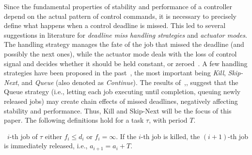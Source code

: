 Since the fundamental properties of stability and performance of a controller depend on the actual pattern of control commands, it is necessary to precisely define what happens when a control deadline is missed.
This led to several suggestions in literature for \emph{deadline miss handling strategies} and \emph{actuator modes}.
The handling strategy manages the fate of the job that missed the deadline (and possibly the next ones), while the actuator mode deals with the loss of control signal and decides whether it should be held constant, or zeroed~\cite{schenato09}.
A few handling strategies  have been proposed in the past~\cite{Cervin:2005,Pazzaglia:2018, Pazzaglia:2019, Maggio:2020,pazzaglia2020generalized}, the most important being \emph{Kill}, \emph{Skip-Next}, and \emph{Queue} (also denoted as \emph{Continue}).
The results of~\cite{Cervin:2005, Pazzaglia:2019},,\cite{Maggio:2020} suggest that the Queue strategy (i.e., letting each job executing until completion, queuing newly released jobs) may create chain effects of missed deadlines, negatively affecting stability and performance.
Thus, Kill and Skip-Next will be the focus of this paper.
The following definitions hold for a task $\tau$, with period $T$.

\begin{definition}%
    \label{def:kill}%
    ~$i$-th job of $\tau$ either $f_i\leq d_i$ or $f_i=\infty$.
    If the $i$-th job is killed, the $(i+1)$-th job is immediately released, i.e., $a_{i+1} = a_{i} + T$.
\end{definition}

